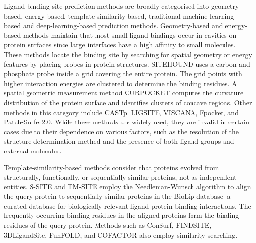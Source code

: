\documentclass[journal=jcisd8,manuscript=article]{achemso}
\begin{document}
Ligand binding site prediction methods are broadly categorised into geometry-based, energy-based, template-similarity-based, traditional machine-learning-based and deep-learning-based prediction methods\cite{zhao2020exploring}. Geometry-based and energy-based methods maintain that most small ligand bindings occur in cavities on protein surfaces since large interfaces have a high affinity to small molecules. These methods locate the binding site by searching for spatial geometry or energy features by placing probes in protein structures. SITEHOUND\cite{hernandez2009sitehound} uses a carbon and phosphate probe inside a grid covering the entire protein. The grid points with higher interaction energies are clustered to determine the binding residues. A spatial geometric measurement method CURPOCKET\cite{liu2020cb} computes the curvature distribution of the protein surface and identifies clusters of concave regions. Other methods in this category include CASTp\cite{dundas2006castp}, LIGSITE\cite{hendlich1997ligsite}, VISCANA\cite{amari2006viscana}, Fpocket\cite{le2009fpocket}, and Patch-Surfer2.0\cite{zhu2015large}. While these methods are widely used, they are invalid in certain cases due to their dependence on various factors, such as the resolution of the structure determination method and the presence of both ligand groups and external molecules.

\newpage
Template-similarity-based methods consider that proteins evolved from structurally, functionally, or sequentially similar proteins, not as independent entities. S-SITE and TM-SITE\cite{yang2013protein} employ the Needleman-Wunsch algorithm to align the query protein to sequentially-similar proteins in the BioLip\cite{yang2012biolip} database, a curated database for biologically relevant ligand-protein binding interactions. The frequently-occurring binding residues in the aligned proteins form the binding residues of the query protein. Methods such as ConSurf\cite{glaser2003consurf}, FINDSITE\cite{brylinski2008threading}, 3DLigandSite\cite{wass20103dligandsite}, FunFOLD\cite{roche2011funfold}, and COFACTOR\cite{roy2012recognizing} also employ similarity searching.
\end{document}
